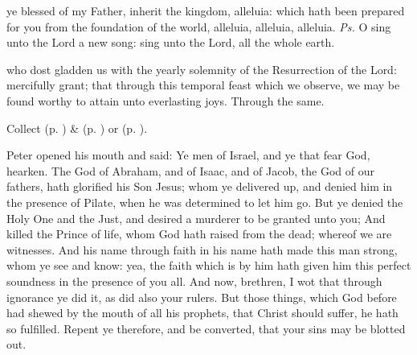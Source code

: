 

\introit
{} ye blessed of my Father, inherit the kingdom, alleluia: which hath been prepared for you from the foundation of the world, alleluia, alleluia, alleluia. \textit{Ps.} O sing unto the Lord a new song: sing unto the Lord, all the whole earth.

\collect
{} who dost gladden us with the yearly solemnity of the Resurrection of the Lord: mercifully grant; that through this temporal feast which we observe, we may be found worthy to attain unto everlasting joys. Through the same.
\begin{rubric}
     Collect  (p. \pageref{EasterCollect}) \&   (p. \pageref{SPAgainst}) or  (p. \pageref{SPChiefBishop}).
\end{rubric}

 Peter opened his mouth and said: Ye men of Israel, and ye that fear God, hearken. The God of Abraham, and of Isaac, and of Jacob, the God of our fathers, hath glorified his Son Jesus; whom ye delivered up, and denied him in the presence of Pilate, when he was determined to let him go. But ye denied the Holy One and the Just, and desired a murderer to be granted unto you; And killed the Prince of life, whom God hath raised from the dead; whereof we are witnesses. And his name through faith in his name hath made this man strong, whom ye see and know: yea, the faith which is by him hath given him this perfect soundness in the presence of you all. And now, brethren, I wot that through ignorance ye did it, as did also your rulers. But those things, which God before had shewed by the mouth of all his prophets, that Christ should suffer, he hath so fulfilled. Repent ye therefore, and be converted, that your sins may be blotted out.


